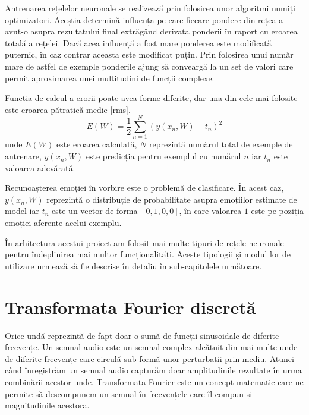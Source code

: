\documentclass[a4paper,12pt]{book}
\begin{document}
			Antrenarea rețelelor neuronale se realizează prin folosirea unor algoritmi numiți optimizatori. Aceștia determină influența pe care fiecare pondere din rețea a avut-o asupra rezultatului final extrăgând derivata ponderii în raport cu eroarea totală a rețelei. Dacă acea influență a fost mare ponderea este modificată puternic, în caz contrar aceasta este modificat puțin. Prin folosirea unui număr mare de astfel de exemple ponderile ajung să conveargă la un set de valori care permit aproximarea unei multitudini de funcții complexe. \par
			
			Funcția de calcul a erorii poate avea forme diferite, dar una din cele mai folosite este eroarea pătratică medie \ref{rms}.
			\begin{equation} \label{rms}
				E(W) = \frac{1}{2} \sum_{n=1}^{N} (y(x_n, W) - t_n)^2
			\end{equation}
			unde $E(W)$ este eroarea calculată, $N$ reprezintă numărul total de exemple de antrenare, $y(x_n, W)$ este predicția pentru exemplul cu numărul $n$ iar $t_n$ este valoarea adevărată. \par
			
			Recunoașterea emoției în vorbire este o problemă de clasificare. În acest caz, $y(x_n, W)$ reprezintă o distribuție de probabilitate asupra emoțiilor estimate de model iar $t_n$ este un vector de forma $[0,1,0,0]$, în care valoarea $1$ este pe poziția emoției aferente acelui exemplu. \par
			
			În arhitectura acestui proiect am folosit mai multe tipuri de rețele neuronale pentru îndeplinirea mai multor funcționalități. Aceste tipologii și modul lor de utilizare urmează să fie descrise în detaliu în sub-capitolele următoare.
			\section{Transformata Fourier discretă} 
			
			Orice undă reprezintă de fapt doar o sumă de funcții sinusoidale de diferite frecvențe. Un semnal audio este un semnal complex alcătuit din mai multe unde de diferite frecvențe care circulă sub formă unor perturbații prin mediu. Atunci când înregistrăm un semnal audio capturăm doar amplitudinile rezultate în urma combinării acestor unde. Transformata Fourier este un concept matematic care ne permite să descompunem un semnal în frecvențele care îl compun și magnitudinile acestora.\par 
			
\end{document}
